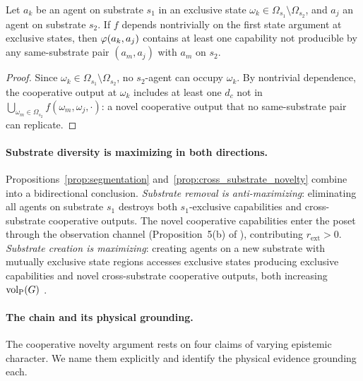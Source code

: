 \begin{proposition}
\label{prop:cross_substrate_novelty}
Let $a_k$ be an agent on substrate $s_1$ in an exclusive state
    $\omega_k \in \Omega_{s_1} \setminus \Omega_{s_2}$, and $a_j$ an agent
    on substrate $s_2$. If $f$ depends nontrivially on the first state
    argument at exclusive states, then $\varphi(a_k, a_j)$ contains at
    least one capability not producible by any same-substrate pair
    $(a_m, a_j)$ with $a_m$ on $s_2$.
\end{proposition}

\begin{proof}
Since $\omega_k \in \Omega_{s_1} \setminus \Omega_{s_2}$, no $s_2$-agent
can occupy $\omega_k$. By nontrivial dependence, the cooperative output at
$\omega_k$ includes at least one $d_c$ not in $\bigcup_{\omega_m \in
\Omega_{s_2}} f(\omega_m, \omega_j, \cdot)$: a novel cooperative output
that no same-substrate pair can replicate.
\end{proof}

\paragraph{Substrate diversity is maximizing in both directions.}
Propositions~\ref{prop:segmentation} and~\ref{prop:cross_substrate_novelty}
combine into a bidirectional conclusion. \emph{Substrate removal is
anti-maximizing}: eliminating all agents on substrate $s_1$ destroys both
$s_1$-exclusive capabilities and cross-substrate cooperative outputs.
The novel cooperative capabilities enter the poset through the observation
channel (Proposition~5(b) of \citet{lasser2026poset}), contributing
$r_{\mathrm{ext}} > 0$. \emph{Substrate creation is maximizing}: creating
agents on a new substrate with mutually exclusive state regions accesses
exclusive states producing exclusive capabilities and novel cross-substrate
cooperative outputs, both increasing ${\operatorname{vol}_{\mathrm{P}}}(G)$ \citep{page2007difference}.

\paragraph{The chain and its physical grounding.}
The cooperative novelty argument rests on four claims of varying epistemic
character. We name them explicitly and identify the physical evidence
grounding each.

